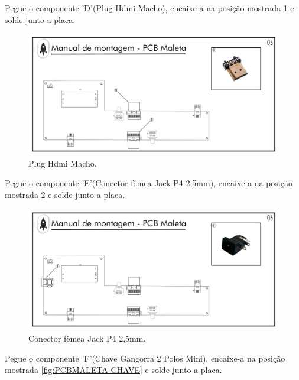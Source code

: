\par Pegue o componente 'D'(Plug Hdmi Macho), encaixe-a na posição mostrada \ref{fig:PCBMALETA Hdmi} e solde junto a placa.
\begin{figure}[H]
  \centering
  \includegraphics[width=\textwidth]{Figuras/MALETA/Pg-05---PL-01.png}
  \caption{Plug Hdmi Macho.}
  \label{fig:PCBMALETA Hdmi}
\end{figure}


\par Pegue o componente 'E'(Conector fêmea Jack P4 2,5mm), encaixe-a na posição mostrada \ref{fig:PCBMALETA Jack} e solde junto a placa.

\begin{figure}[H]
  \centering
  \includegraphics[width=\textwidth]{Figuras/MALETA/Pg-06---PL-01.png}
  \caption{Conector fêmea Jack P4 2,5mm.}
  \label{fig:PCBMALETA Jack}
\end{figure}

\newpage

\par Pegue o componente 'F'(Chave Gangorra 2 Polos Mini), encaixe-a na posição mostrada \ref{fig:PCBMALETA CHAVE} e solde junto a placa.

